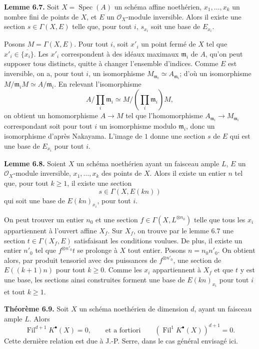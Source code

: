 \documentclass[11pt]{article}
\newcommand{\Fil}{\operatorname{Fil}}
\newcommand{\Spec}{\operatorname{Spec}}
\begin{document}
\textbf{Lemme 6.7.} Soit \(X=\Spec(A)\) un schéma affine noethérien, \(x_1,\ldots,x_k\) un nombre fini de points de \(X\), et \(E\) un \(\mathcal O_X\)-module inversible. Alors il existe une section \(s\in\Gamma(X,E)\) telle que, pour tout \(i\), \(s_{x_i}\) soit une base de \(E_{x_i}\).

Posons \(M=\Gamma(X,E)\). Pour tout \(i\), soit \(x'_i\) un point fermé de \(X\) tel que \(x'_i\in\overline{\{x_i\}}\). Les \(x'_i\) correspondent à des idéaux maximaux \(\mathfrak m_i\) de \(A\), qu'on peut supposer tous distincts, quitte à changer l'ensemble d'indices. Comme \(E\) est inversible, on a, pour tout \(i\), un isomorphisme \(M_{\mathfrak m_i}\simeq A_{\mathfrak m_i}\); d'où un isomorphisme \(M/\mathfrak m_iM\simeq A/\mathfrak m_i\). En relevant l'isomorphisme
\[
  A/\prod_i\mathfrak m_i\simeq
  M/\left(\prod_i\mathfrak m_i\right)M,
\]
on obtient un homomorphisme \(A\to M\) tel que l'homomorphisme \(A_{\mathfrak m_i}\to M_{\mathfrak m_i}\) correspondant soit pour tout \(i\) un isomorphisme modulo \(\mathfrak m_i\), donc un isomorphisme d'après Nakayama. L'image de \(1\) donne une section \(s\) de \(E\) qui est une base de \(E_{x_i}\) pour tout \(i\).

\textbf{Lemme 6.8.} Soient \(X\) un schéma noethérien ayant un faisceau ample \(L\), \(E\) un \(\mathcal O_X\)-module inversible, \(x_1,\ldots,x_k\) des points de \(X\). Alors il existe un entier \(n\) tel que, pour tout \(k\geq1\), il existe une section
\[
  s\in\Gamma(X,E(kn))
\]
qui soit une base de \(E(kn)_{x_i}\), pour tout \(i\).

On peut trouver un entier \(n_0\) et une section \(f\in\Gamma(X,L^{\otimes n_0})\) telle que tous les \(x_i\) appartiennent à l'ouvert affine \(X_f\). Sur \(X_f\), on trouve par le lemme 6.7 une section \(t\in\Gamma(X_f,E)\) satisfaisant les conditions voulues. De plus, il existe un entier \(n'_0\) tel que \(f^{\otimes n'_0}t\) se prolonge à \(X\) tout entier. Posons \(n=n_0n'_0\). On obtient alors, par produit tensoriel avec des puissances de \(f^{\otimes n'_0}\), une section de \(E((k+1)n)\) pour tout \(k\geq0\). Comme les \(x_i\) appartiennent à \(X_f\) et que \(t\) y est une base, les sections ainsi construites forment une base de \(E(kn)_{x_i}\) pour tout \(i\) et tout \(k\geq1\).

\textbf{Théorème 6.9.} Soit \(X\) un schéma noethérien de dimension \(d\), ayant un faisceau ample \(L\). Alors
\[
  \Fil^{d+1}K^\bullet(X)=0,
  \qquad\text{et a fortiori}\qquad
  (\Fil^1K^\bullet(X))^{d+1}=0.
\]
Cette dernière relation est due à J.-P. Serre, dans le cas général envisagé ici.
\end{document}
